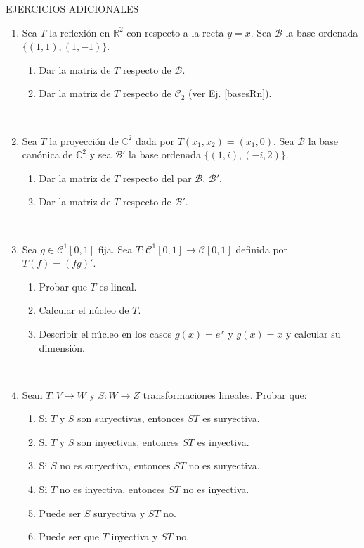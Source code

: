 \documentclass[11pt,spanish,makeidx]{amsbook}
\newcommand\R{\mathbb{R}}
\newcommand\C{\mathbb{C}}
\newcommand\B {\mathcal{B}}
\begin{document}
\medskip
\centerline{\sc EJERCICIOS ADICIONALES}
\bigskip

\begin{enumerate}

\item Sea $T$ la reflexi\'on en $\R^2$ con respecto a la recta $y=x$. Sea $\mathcal B$ la base ordenada $\{(1,1),(1,-1)\}$.
\begin{enumerate}
	\item Dar la matriz de $T$ respecto de $\B$.
	\item Dar la matriz de $T$ respecto de $\mathcal{C}_2$ (ver Ej. \ref{basesRn}).
\end{enumerate}
	
\

\item Sea $T$ la proyecci\'on de $\C^2$ dada por $T(x_1,x_2)=(x_1,0)$.
Sea $\B$ la base can\'onica de $\C^2$ y sea $\B'$ la base ordenada $\{(1,i),(-i,2)\}$.
\begin{enumerate}
	\item Dar la matriz de $T$ respecto del par $\B$, $\B'$.
	\item Dar la matriz de $T$ respecto de $\B'$.
\end{enumerate}
	
\

\item Sea $g\in \mathcal{C}^1[0,1]$ fija. Sea $T:\mathcal{C}^1[0,1]\longrightarrow
\mathcal{C}[0,1]$ definida por
$T(f)=(fg)'$.
\begin{enumerate}
	\item  Probar que $T$ es lineal.
	\item Calcular el n\'ucleo de $T$.
	\item Describir el n\'ucleo en los casos $g(x)=e^x$ y $g(x)=x$ y
	calcular su dimensi\'on.
\end{enumerate}
	
\

\item Sean $T:V\longrightarrow W$ y $S:W\longrightarrow Z$ transformaciones lineales.
Probar que:
\begin{enumerate}
	\item Si $T$ y $S$ son suryectivas, entonces $ST$ es suryectiva.
	\item Si $T$ y $S$ son inyectivas, entonces $ST$ es inyectiva.
	\item Si $S$ no es suryectiva, entonces $ST$ no es suryectiva.
	\item Si $T$ no es inyectiva, entonces $ST$ no es inyectiva.
	\item Puede ser $S$ suryectiva y $ST$ no.
	\item Puede ser que $T$ inyectiva y $ST$ no.
\end{enumerate}
	

\end{enumerate}
\end{document}
